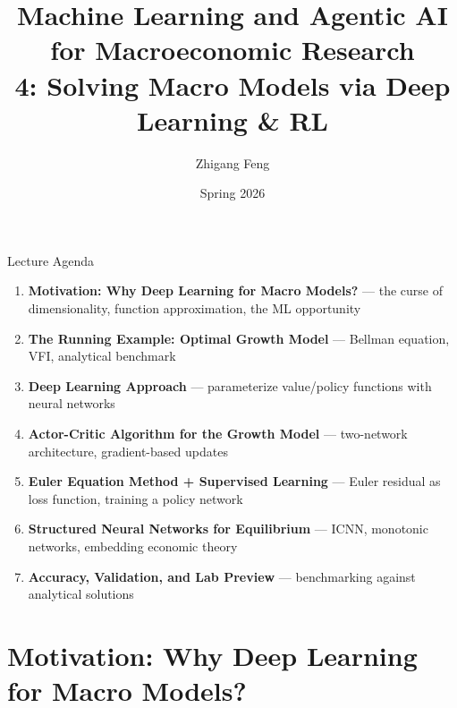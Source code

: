 \documentclass[10pt,english,aspectratio=169]{beamer}
\title[ML \& Agentic AI for Macro Research]{Machine Learning and Agentic AI for Macroeconomic Research\\
4: Solving Macro Models via Deep Learning \& RL\\[0.5em]}
\author{Zhigang Feng}
\date{Spring 2026}
\newcommand\makebeamertitle{\frame{\maketitle}}%
\begin{document}
\makebeamertitle


\begin{frame}{Lecture Agenda}
\begin{enumerate}
  \item \textbf{Motivation: Why Deep Learning for Macro Models?}
    --- the curse of dimensionality, function approximation, the ML opportunity
  \medskip
  \item \textbf{The Running Example: Optimal Growth Model}
    --- Bellman equation, VFI, analytical benchmark
  \medskip
  \item \textbf{Deep Learning Approach}
    --- parameterize value/policy functions with neural networks
  \medskip
  \item \textbf{Actor-Critic Algorithm for the Growth Model}
    --- two-network architecture, gradient-based updates
  \medskip
  \item \textbf{Euler Equation Method + Supervised Learning}
    --- Euler residual as loss function, training a policy network
  \medskip
  \item \textbf{Structured Neural Networks for Equilibrium}
    --- ICNN, monotonic networks, embedding economic theory
  \medskip
  \item \textbf{Accuracy, Validation, and Lab Preview}
    --- benchmarking against analytical solutions
\end{enumerate}
\end{frame}


\section{Motivation: Why Deep Learning for Macro Models?}
\end{document}
